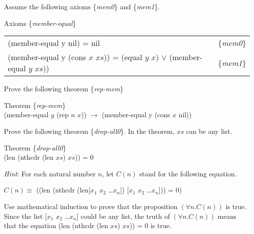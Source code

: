 \begin{ExerciseList}
\Exercise Assume the following axioms \{\emph{mem0}\} and \{\emph{mem1}\}.
\begin{samepage}
\label{member-equal-equations}
\begin{center}
Axioms \{\emph{member-equal}\} \\
\begin{tabular}{ll}
(member-equal y nil) = nil                                                         & \{\emph{mem0}\} \\
(member-equal y (cons $x$ $xs$)) = (equal $y$ $x$) $\vee$ (member-equal $y$ $xs$)) & \{\emph{mem1}\}
\end{tabular}
\end{center}
\end{samepage}
Prove the following theorem \{\emph{rep-mem}\}
\begin{samepage}
\label{rep-mem}
\begin{center}
Theorem \{\emph{rep-mem}\} \\
(member-equal $y$ (rep $n$ $x$)) $\rightarrow$ (member-equal y (cons $x$ nil))
\end{center}
\end{samepage}

\Exercise Prove the following theorem \{\emph{drop-all0}\}.
In the theorem, $xs$ can be any list.
\begin{samepage}
\label{drop-all0}
\begin{center}
Theorem \{\emph{drop-all0}\} \\
(len (nthcdr (len $xs$) $xs$)) = 0
\end{center}
\emph{Hint}: For each natural number $n$, let $C(n)$ stand for the following equation.
\begin{center}
$C(n) \equiv$ ((len (nthcdr (len[$x_1$ $x_2$ \dots $x_n$]) [$x_1$ $x_2$ \dots $x_n$])) = 0)
\end{center}
\end{samepage}
Use mathematical induction to prove that the proposition $(\forall n.C(n))$ is true.
Since the list [$x_1$ $x_2$ \dots $x_n$] could be any list,
the truth of $(\forall n.C(n))$ means that
the equation (len (nthcdr (len $xs$) $xs$)) = 0 is true.


\end{ExerciseList}
